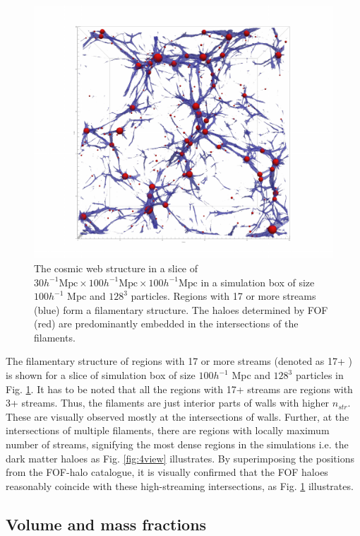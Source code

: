 \begin{figure}
 \centering\includegraphics[width=18.5cm]{Chapter3/Source_v2/fig1.pdf} 
\caption{The cosmic web structure in a slice of  $30 h^{-1} \text{Mpc} \times 100 h^{-1} \text{Mpc} \times 100 h^{-1} \text{Mpc}$ in a simulation box of size $100 h^{-1}$ Mpc and $128^3$ particles. Regions with 17 or more streams (blue) form a filamentary structure. The haloes determined by FOF (red) are predominantly embedded in the intersections of the filaments.}
\label{fig:full}
\end{figure}

The filamentary structure of regions with 17 or more streams (denoted as 17+ ) is shown for a slice of simulation box of size $100 h^{-1}$  Mpc and $128^3$  particles in Fig. \ref{fig:full}. It has to be noted that all the regions with 17+ streams are regions with 3+ streams. Thus, the filaments are just interior
parts  of walls with higher $n_{str}$. These are visually observed mostly at the intersections of walls. Further, at the intersections of multiple filaments, there are regions with locally maximum number of streams, signifying the most dense regions in the simulations i.e. the dark matter haloes as Fig. \ref{fig:4view}
illustrates.
By superimposing the positions from the FOF-halo catalogue, it is visually confirmed that the FOF haloes reasonably coincide with these high-streaming intersections, as Fig. \ref{fig:full} illustrates.

\subsection{Volume and mass fractions}

